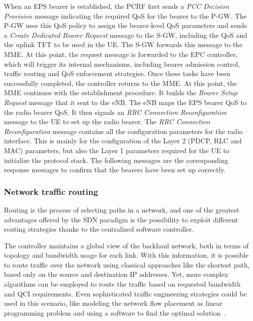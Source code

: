 When an \ac{EPS} bearer is established, the \ac{PCRF} first sends a
\emph{\ac{PCC} Decision Provision} message indicating the required \ac{QoS} for
the bearer to the \ac{P-GW}. The \ac{P-GW} uses this \ac{QoS} policy to assign
the bearer-level \ac{QoS} parameters and sends a \emph{Create Dedicated
Bearer Request} message to the \ac{S-GW}, including the \ac{QoS} and the uplink
\ac{TFT} to be used in the \ac{UE}. The \ac{S-GW} forwards this message to the
\ac{MME}. At this point, the request message is forwarded to the \ac{EPC}
controller, which will trigger its internal mechanisms, including bearer
admission control, traffic routing and \ac{QoS} enforcement strategies. Once
these tasks have been successfully completed, the controller returns to the
\ac{MME}. At this point, the \ac{MME} continues with the establishment
procedure. It builds the \emph{Bearer Setup Request} message that it sent to
the \ac{eNB}. The \ac{eNB} maps the \ac{EPS} bearer \ac{QoS} to the radio
bearer \ac{QoS}. It then signals an \emph{\ac{RRC} Connection Reconfiguration}
message to the \ac{UE} to set up the radio bearer. The \emph{\ac{RRC}
Connection Reconfiguration} message contains all the configuration parameters
for the radio interface. This is mainly for the configuration of the Layer 2
(\ac{PDCP}, \ac{RLC} and \ac{MAC}) parameters, but also the Layer 1 parameters
required for the \ac{UE} to initialize the protocol stack. The following
messages are the corresponding response messages to confirm that the bearers
have been set up correctly.

\subsubsection{Network traffic routing}
\label{subsec:routing}

Routing is the process of selecting paths in a network, and one of the greatest
advantages offered by the \ac{SDN} paradigm is the possibility to exploit
different routing strategies thanks to the centralized software controller.

The controller maintains a global view of the backhaul network, both in terms
of topology and bandwidth usage for each link. With this information, it is
possible to route traffic over the network using classical approaches like the
shortest path, based only on the source and destination \ac{IP} addresses.
Yet, more complex algorithms can be employed to route the traffic based on
requested bandwidth and \ac{QCI} requirements. Even sophisticated traffic
engineering strategies could be used in this scenario, like modeling the
network flow placement as linear programming problem and using a software to
find the optimal solution~\cite{Medhi2007}.

